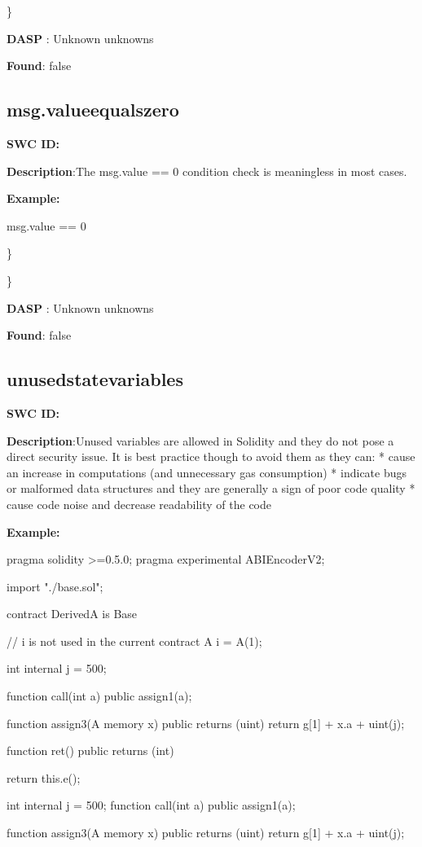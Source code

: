 \documentclass{article}
\begin{document}
{\} 

\textbf{DASP} : Unknown unknowns

\textbf{Found}: false

\subsection{msg.value\textunderscore equals\textunderscore zero} 
\textbf{SWC \textunderscore ID:} 

\textbf{Description}:The msg.value == 0 condition check is meaningless in most cases.


\textbf{Example:} 

msg.value == 0

\} 

\} 

\textbf{DASP} : Unknown unknowns

\textbf{Found}: false

\subsection{unused\textunderscore state\textunderscore variables} 
\textbf{SWC \textunderscore ID:} 

\textbf{Description}:Unused variables are allowed in Solidity and they do not pose a direct security issue. It is best practice though to avoid them as they can:
* cause an increase in computations (and unnecessary gas consumption)
* indicate bugs or malformed data structures and they are generally a sign of poor code quality
* cause code noise and decrease readability of the code


\textbf{Example:} 

pragma solidity >=0.5.0;
pragma experimental ABIEncoderV2;

import "./base.sol";

contract DerivedA is Base {
    // i is not used in the current contract
    A i = A(1);

    int internal j = 500;

    function call(int a) public {
        assign1(a);
    }

    function assign3(A memory x) public returns (uint) {
        return g[1] + x.a + uint(j);
    }

    function ret() public returns (int){
        return this.e();

    }
  int internal j = 500;
function call(int a) public {
        assign1(a);
    }

    function assign3(A memory x) public returns (uint) {
        return g[1] + x.a + uint(j);
    }

}}
\end{document}
